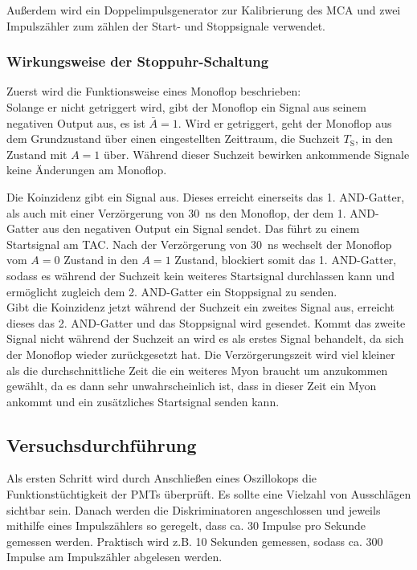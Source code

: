         Außerdem wird ein Doppelimpulsgenerator zur Kalibrierung des MCA und zwei Impulszähler zum zählen der Start- und Stoppsignale verwendet.

    \subsubsection*{Wirkungsweise der Stoppuhr-Schaltung}
        Zuerst wird die Funktionsweise eines Monoflop beschrieben: \\
        Solange er nicht getriggert wird, gibt der Monoflop ein Signal aus seinem negativen Output aus, es ist $\bar{A} = 1$.
        Wird er getriggert, geht der Monoflop aus dem Grundzustand über einen eingestellten Zeittraum, die Suchzeit $T_{\text{S}}$, in den Zustand mit $A = 1$ über.
        Während dieser Suchzeit bewirken ankommende Signale keine Änderungen am Monoflop.

        Die Koinzidenz gibt ein Signal aus. Dieses erreicht einerseits das 1. AND-Gatter, als auch mit einer Verzörgerung von \SI{30}{ns} den Monoflop, der dem 1. AND-Gatter aus den negativen Output ein Signal sendet. Das führt zu einem Startsignal am TAC. Nach der Verzörgerung von \SI{30}{ns} wechselt der Monoflop vom $A=0$ Zustand in den $A=1$ Zustand, blockiert somit das 1. AND-Gatter, sodass es während der Suchzeit kein weiteres Startsignal durchlassen kann und ermöglicht zugleich dem 2. AND-Gatter ein Stoppsignal zu senden. \\
        Gibt die Koinzidenz jetzt während der Suchzeit ein zweites Signal aus, erreicht dieses das 2. AND-Gatter und das Stoppsignal wird gesendet. Kommt das zweite Signal nicht während der Suchzeit an wird es als erstes Signal behandelt, da sich der Monoflop wieder zurückgesetzt hat. Die Verzörgerungszeit wird viel kleiner als die durchschnittliche Zeit die ein weiteres Myon braucht um anzukommen gewählt, da es dann sehr unwahrscheinlich ist, dass in dieser Zeit ein Myon ankommt und ein zusätzliches Startsignal senden kann.

    \subsection{Versuchsdurchführung}
        Als ersten Schritt wird durch Anschließen eines Oszillokops die Funktionstüchtigkeit der PMTs überprüft. Es sollte eine Vielzahl von Ausschlägen sichtbar sein. Danach werden die Diskriminatoren angeschlossen und jeweils mithilfe eines Impulszählers so geregelt, dass ca. 30 Impulse pro Sekunde gemessen werden. Praktisch wird z.B. 10 Sekunden gemessen, sodass ca. 300 Impulse am Impulszähler abgelesen werden.

